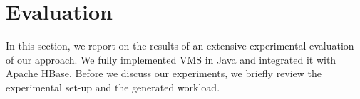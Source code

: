 \section{Evaluation}
\label{sec:evaluation}

In this section, we report on the results of an extensive experimental
evaluation of our approach.  We fully implemented VMS in Java and
integrated it with Apache HBase. Before we discuss our experiments, we
briefly review the experimental set-up and the generated workload.

%
%
%
%

